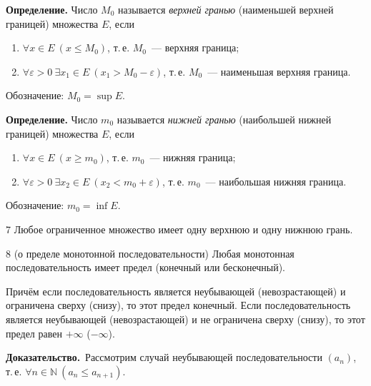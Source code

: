 \documentclass[a4paper,11pt]{article}
\newcommand{\dok}{\textbf{Доказательство.}\ }
\begin{document}
\begin{opr}
\textbf{Определение.} Число $M_0$ называется \emph{верхней гранью} (наименьшей верхней границей)
множества $E$, если
\begin{enumerate}[label=\arabic*)]
  \item $\forall x \in E\ (x \le M_0)$, т.\,е. $M_0$~--- верхняя граница;
  \item $\forall \varepsilon > 0\ \exists x_1 \in E\ (x_1 > M_0 - \varepsilon)$, т.\,е. $M_0$~---
        наименьшая верхняя граница.
\end{enumerate}
Обозначение: $M_0 = \sup E$.
\end{opr}

\begin{opr}
\textbf{Определение.} Число $m_0$ называется \emph{нижней гранью} (наибольшей нижней границей)
множества $E$, если
\begin{enumerate}[label=\arabic*)]
  \item $\forall x \in E\ (x \ge m_0)$, т.\,е. $m_0$~--- нижняя граница;
  \item $\forall \varepsilon > 0\ \exists x_2 \in E\ (x_2 < m_0 + \varepsilon)$, т.\,е. $m_0$~---
        наибольшая нижняя граница.
\end{enumerate}
Обозначение: $m_0 = \inf E$.
\end{opr}

\begin{teor}{7}
  Любое ограниченное множество имеет одну верхнюю и одну нижнюю грань.
\end{teor}

\begin{teor}{8 (о пределе монотонной последовательности)}
  Любая монотонная последовательность имеет предел (конечный или бесконечный).

  Причём если последовательность является неубывающей (невозрастающей) и ограничена сверху (снизу),
  то этот предел конечный. Если последовательность является неубывающей (невозрастающей)
  и не ограничена сверху (снизу), то этот предел равен $+\infty$ ($-\infty$).
\end{teor}

\dok Рассмотрим случай неубывающей последовательности $(a_n)$, т.\,е.
$\forall n \in \mathbb{N}\ (a_n \le a_{n+1})$.
\end{document}
